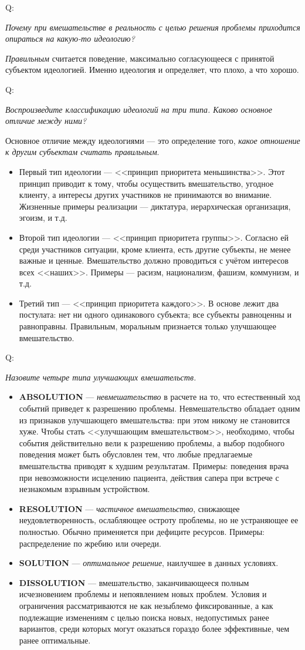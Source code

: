 \documentclass{article}
\newcommand{\note}[1]{\textit{#1}}
\newcommand{\important}[1]{\textbf{#1}}
\newcommand{\question}[2]{
	\begin{flushright}
		Q:\hspace{2ex}\vline\hspace{2ex}
		\begin{minipage}{0.9\textwidth}
			\large
			\textit{#1}
		\end{minipage}
	\end{flushright}
	\begin{center}
		\begin{minipage}{0.95\textwidth}
			#2
		\end{minipage}
	\end{center}
	}
\begin{document}
\question{Почему при вмешательстве в реальность с целью решения проблемы приходится опираться на какую-то идеологию?}{\note{Правильным} считается поведение, максимально согласующееся с принятой субъектом идеологией. Именно идеология и определяет, что плохо, а что хорошо.}
\question{Воспроизведите классификацию идеологий на три типа. Каково основное отличие между ними?}{Основное отличие между идеологиями --- это определение того, \note{какое отношение к другим субъектам считать правильным}.
	\begin{itemize}
		\item Первый тип идеологии --- <<принцип приоритета меньшинства>>. Этот принцип приводит к тому, чтобы осуществить вмешательство, угодное клиенту, а интересы других участников не принимаются во внимание. Жизненные примеры реализации --- диктатура, иерархическая организация, эгоизм, и т.д.
		\item Второй тип идеологии --- <<принцип приоритета группы>>. Согласно ей среди участников ситуации, кроме клиента, есть другие субъекты, не менее важные и ценные. Вмешательство должно проводиться с учётом интересов всех <<наших>>. Примеры --- расизм, национализм, фашизм, коммунизм, и т.д.
		\item Третий тип --- <<принцип приоритета каждого>>. В основе лежит два постулата: нет ни одного одинакового субъекта; все субъекты равноценны и равноправны. Правильным, моральным признается только улучшающее вмешательство.
	\end{itemize}}
\question{Назовите четыре типа улучшающих вмешательств.}{
	\begin{itemize}
		\item \important{ABSOLUTION} --- \note{невмешательство} в расчете на то, что естественный ход событий приведет к разрешению проблемы. Невмешательство обладает одним из признаков улучшающего вмешательства: при этом никому не становится хуже. Чтобы стать <<улучшающим вмешательством>>, необходимо, чтобы события действительно вели к разрешению проблемы, а выбор подобного поведения может быть обусловлен тем, что любые предлагаемые вмешательства приводят к худшим результатам. Примеры: поведения врача при невозможности исцелению пациента, действия сапера при встрече с незнакомым взрывным устройством.
		\item \important{RESOLUTION} --- \note{частичное вмешательство}, снижающее неудовлетворенность, ослабляющее остроту проблемы, но не устраняющее ее полностью. Обычно применяется при дефиците ресурсов. Примеры: распределение по жребию или очереди.
		\item \important{SOLUTION} --- \note{оптимальное решение}, наилучшее в данных условиях. 
		\item \important{DISSOLUTION} --- вмешательство, заканчивающееся полным исчезновением проблемы и непоявлением новых проблем. Условия и ограничения рассматриваются не как незыблемо фиксированные, а как подлежащие изменениям с целью поиска новых, недопустимых ранее вариантов, среди которых могут оказаться гораздо более эффективные, чем ранее оптимальные.
	\end{itemize}}
\end{document}
